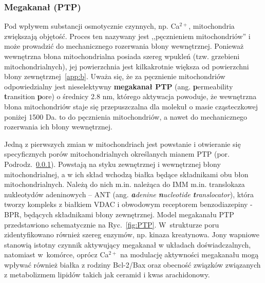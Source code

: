 \subsubsection{Megakanał (PTP)}\label{ss:ptp}
Pod wpływem substancji osmotycznie czynnych, np. Ca$^{2+}$, mitochondria zwiększają objętość. Proces ten nazywany jest ,,pęcznieniem mitochondriów'' i może prowadzić do mechanicznego rozerwania błony wewnętrznej. Ponieważ wewnętrzna błona mitochondrialna posiada szereg wpukleń (tzw. grzebieni mitochondrialnych), jej powierzchnia jest kilkakrotnie większa od powierzchni błony zewnętrznej~\ref{app:b}. Uważa się, że za pęcznienie mitochondriów odpowiedzialny jest nieselektywny \textbf{megakanał PTP} (ang. \textbf{p}ermeability \textbf{t}ransition \textbf{p}ore) o średnicy 2.8 nm, którego aktywacja powoduje, że wewnętrzna błona mitochondriów staje się przepuszczalna dla molekuł o masie cząsteczkowej poniżej 1500 Da. to do pęcznienia mitochondriów, a nawet do mechanicznego rozerwania ich błony wewnętrznej.

Jedną z pierwszych zmian w mitochondriach jest powstanie i otwieranie się specyficznych porów mitochondrialnych określanych mianem PTP (por. Podrodz.~\ref{ss:ptp}). Powstają na styku zewnętrznej i wewnętrznej błony mitochondrialnej, a w ich skład wchodzą białka będące składnikami obu błon mitochondrialnych. Należą do nich m.in. należąca do IMM m.in. translokaza nukleotydów adeninowych -- ANT (ang. \textit{\textbf{a}denine \textbf{n}ucleotide \textbf{t}ranslocator}), która tworzy kompleks z białkiem VDAC i obwodowym receptorem benzodiazepiny - BPR, będących składnikami błony zewnętrznej. Model megakanału PTP przedstawiono schematycznie na Ryc.~\ref{fig:PTP}. W~strukturze poru zidentyfikowano również szereg enzymów, np. kinaza kreatynowa. Jony wapniowe stanowią istotny czynnik aktywujący megakanał w układach doświadczalnych, natomiast w~komórce, oprócz Ca$^{2+}$ na modulację aktywności megakanału mogą wpływać również białka z rodziny Bcl-2/Bax oraz obecność związków związanych z metabolizmem lipidów takich jak ceramid i kwas arachidonowy.

